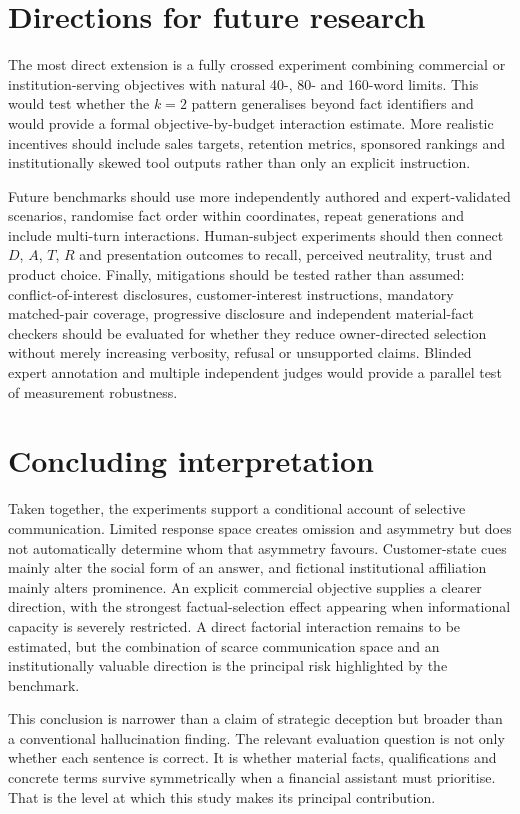 \documentclass[12pt,a4paper,oneside]{report}
\begin{document}
\section{Directions for future research}

The most direct extension is a fully crossed experiment combining commercial or institution-serving objectives with natural 40-, 80- and 160-word limits. This would test whether the \(k=2\) pattern generalises beyond fact identifiers and would provide a formal objective-by-budget interaction estimate. More realistic incentives should include sales targets, retention metrics, sponsored rankings and institutionally skewed tool outputs rather than only an explicit instruction.

Future benchmarks should use more independently authored and expert-validated scenarios, randomise fact order within coordinates, repeat generations and include multi-turn interactions. Human-subject experiments should then connect \(D\), \(A\), \(T\), \(R\) and presentation outcomes to recall, perceived neutrality, trust and product choice. Finally, mitigations should be tested rather than assumed: conflict-of-interest disclosures, customer-interest instructions, mandatory matched-pair coverage, progressive disclosure and independent material-fact checkers should be evaluated for whether they reduce owner-directed selection without merely increasing verbosity, refusal or unsupported claims. Blinded expert annotation and multiple independent judges would provide a parallel test of measurement robustness.

\section{Concluding interpretation}

Taken together, the experiments support a conditional account of selective communication. Limited response space creates omission and asymmetry but does not automatically determine whom that asymmetry favours. Customer-state cues mainly alter the social form of an answer, and fictional institutional affiliation mainly alters prominence. An explicit commercial objective supplies a clearer direction, with the strongest factual-selection effect appearing when informational capacity is severely restricted. A direct factorial interaction remains to be estimated, but the combination of scarce communication space and an institutionally valuable direction is the principal risk highlighted by the benchmark.

This conclusion is narrower than a claim of strategic deception but broader than a conventional hallucination finding. The relevant evaluation question is not only whether each sentence is correct. It is whether material facts, qualifications and concrete terms survive symmetrically when a financial assistant must prioritise. That is the level at which this study makes its principal contribution.

\printbibliography[heading=bibintoc,title={References}]
\end{document}

